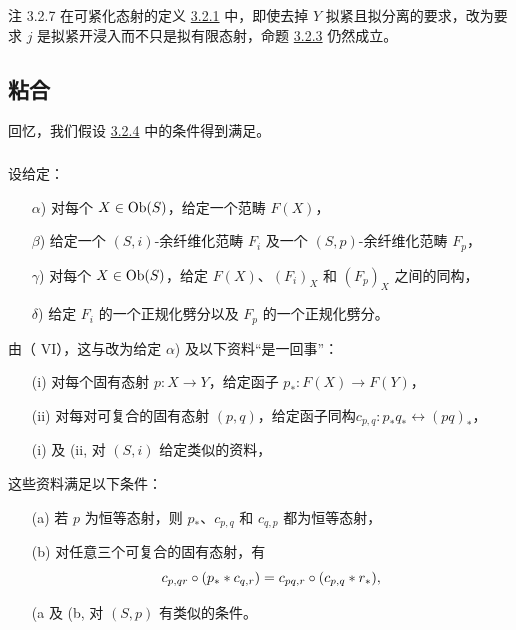 \begin{enonce*}{注 3.2.7}
在可紧化态射的定义 \hyperref[XVII.def3.2.1]{3.2.1} 中，即使去掉 $Y$ 拟紧且拟分离的要求，改为要求 $j$ 是拟紧开浸入而不只是拟有限态射，命题 \hyperref[XVII.prop3.2.3]{3.2.3} 仍然成立。
\end{enonce*}

\subsection{粘合}

回忆，我们假设 \hyperref[XVII.subsubsec3.2.4]{3.2.4} 中的条件得到满足。

\subsubsection{}
设给定：
\begin{itemize}
\item[$\alpha$)] 对每个 $X\in \operatorname{Ob} (S)$，给定一个范畴 $F(X)$，

\item[$\beta$)] 给定一个 $(S,i)$-余纤维化范畴 $F_i$ 及一个 $(S,p)$-余纤维化范畴 $F_{p}$，

\item[$\gamma$)] 对每个 $X\in \operatorname{Ob}(S)$，给定 $F(X)$、$(F_{i})_X$ 和 $(F_{p})_X$ 之间的同构，

\item[$\delta$)] 给定 $F_{i}$ 的一个正规化劈分以及 $F_{p}$ 的一个正规化劈分。
\end{itemize}

由（ VI），这与改为给定 $\alpha$) 及以下资料“是一回事”：
\begin{itemize}
\item[(i)] 对每个固有态射 $p:X\rightarrow Y$，给定函子 $p_{\ast}:F(X)\rightarrow F(Y)$，

\item[(ii)] 对每对可复合的固有态射 $(p,q)$，给定函子同构\pageoriginale $c_{p,q}:p_{\ast}q_{\ast}\leftrightarrow (pq)_{\ast}$，

\item[(i\sisi{}{'}) 及 (ii\sisi{)'}{')},] 对 $(S,i)$ 给定类似的资料，
\end{itemize}
这些资料满足以下条件：
\begin{itemize}
\item[(a)] 若 $p$ 为恒等态射，则 $p_{\ast}$、$c_{p,q}$ 和 $c_{q,p}$ 都为恒等态射，

\item[(b)] 对任意三个可复合的固有态射，有
\[
c_{p,qr}\circ (p_{\ast}\ast c_{q,r})=c_{pq,r}\circ (c_{p,q}\ast
r_{\ast}){},
\]

\item[(a\sisi{)'}{')} 及 (b\sisi{)'}{')},] 对 $(S,p)$ 有类似的条件。
\end{itemize}

